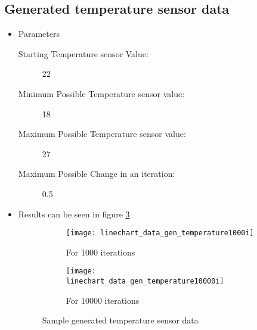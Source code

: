     \subsection{Generated temperature sensor data}
        \begin{itemize}
            \item Parameters
                \begin{description}
                    \item[Starting Temperature sensor Value:] 22
                    \item[Minimum Possible Temperature sensor value:] 18
                    \item[Maximum Possible Temperature sensor value:] 27
                    \item[Maximum Possible Change in an iteration:] 0.5
                \end{description}
            \item Results can be seen in figure \ref{fig:gen_temperature}
                \begin{figure}
                    \centering
                    \captionsetup{type=figure}
                    \begin{subfigure}[b]{0.45\textwidth}
                        \centering
                        \texttt{[image: linechart\_data\_gen\_temperature1000i]}
                        \caption{For 1000 iterations}
                        \label{chart:gen_temperature_1000}
                    \end{subfigure}
                    \hfill
                    \begin{subfigure}[b]{0.45\textwidth}
                        \centering
                        \texttt{[image: linechart\_data\_gen\_temperature10000i]}
                        \caption{For 10000 iterations}
                        \label{chart:gen_temperature_10000}
                    \end{subfigure}
                    
                    \caption{Sample generated temperature sensor data }
                    \label{fig:gen_temperature}
                \end{figure}
            \end{itemize}
